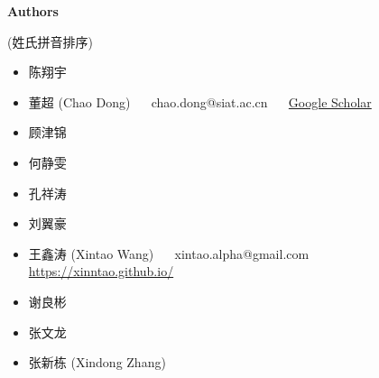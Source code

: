 \documentclass[../main.tex]{subfiles}
\begin{document}
\newpage

{\Large\textbf{Authors}}

(姓氏拼音排序)

\begin{itemize}
	\item 陈翔宇
	\item 董超 (Chao Dong) ~~ chao.dong@siat.ac.cn ~~ \href{https://scholar.google.com.hk/citations?user=OSDCB0UAAAAJ}{Google Scholar}
	\item 顾津锦
	\item 何静雯
	\item 孔祥涛
	\item 刘翼豪
	\item 王鑫涛 (Xintao Wang) ~~ xintao.alpha@gmail.com ~~ \url{https://xinntao.github.io/}
	\item 谢良彬
	\item 张文龙
	\item 张新栋 (Xindong Zhang)
\end{itemize}
\end{document}
